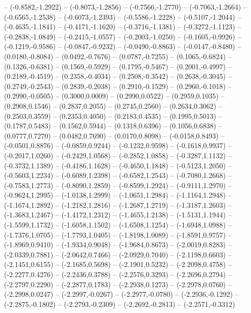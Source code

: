 {	-- (-0.8582,-1.2922)
	-- (-0.8073,-1.2856)
	-- (-0.7566,-1.2770)
	-- (-0.7063,-1.2664)
	-- (-0.6565,-1.2538)
	-- (-0.6073,-1.2393)
	-- (-0.5586,-1.2228)
	-- (-0.5107,-1.2044)
	-- (-0.4635,-1.1841)
	-- (-0.4171,-1.1620)
	-- (-0.3716,-1.1381)
	-- (-0.3272,-1.1123)
	-- (-0.2838,-1.0849)
	-- (-0.2415,-1.0557)
	-- (-0.2003,-1.0250)
	-- (-0.1605,-0.9926)
	-- (-0.1219,-0.9586)
	-- (-0.0847,-0.9232)
	-- (-0.0490,-0.8863)
	-- (-0.0147,-0.8480)
	-- (0.0180,-0.8084)
	-- (0.0492,-0.7676)
	-- (0.0787,-0.7255)
	-- (0.1065,-0.6824)
	-- (0.1326,-0.6381)
	-- (0.1569,-0.5929)
	-- (0.1795,-0.5467)
	-- (0.2001,-0.4997)
	-- (0.2189,-0.4519)
	-- (0.2358,-0.4034)
	-- (0.2508,-0.3542)
	-- (0.2638,-0.3045)
	-- (0.2749,-0.2543)
	-- (0.2839,-0.2038)
	-- (0.2910,-0.1529)
	-- (0.2960,-0.1018)
	-- (0.2990,-0.0505)
	-- (0.3000,0.0009)
	-- (0.2990,0.0522)
	-- (0.2959,0.1035)
	-- (0.2908,0.1546)
	-- (0.2837,0.2055)
	-- (0.2745,0.2560)
	-- (0.2634,0.3062)
	-- (0.2503,0.3559)
	-- (0.2353,0.4050)
	-- (0.2183,0.4535)
	-- (0.1995,0.5013)
	-- (0.1787,0.5483)
	-- (0.1562,0.5944)
	-- (0.1318,0.6396)
	-- (0.1056,0.6838)
	-- (0.0777,0.7270)
	-- (0.0482,0.7690)
	-- (0.0170,0.8098)
	-- (-0.0158,0.8493)
	-- (-0.0501,0.8876)
	-- (-0.0859,0.9244)
	-- (-0.1232,0.9598)
	-- (-0.1618,0.9937)
	-- (-0.2017,1.0260)
	-- (-0.2429,1.0568)
	-- (-0.2852,1.0858)
	-- (-0.3287,1.1132)
	-- (-0.3732,1.1389)
	-- (-0.4186,1.1628)
	-- (-0.4650,1.1848)
	-- (-0.5123,1.2050)
	-- (-0.5603,1.2234)
	-- (-0.6089,1.2398)
	-- (-0.6582,1.2543)
	-- (-0.7080,1.2668)
	-- (-0.7583,1.2773)
	-- (-0.8090,1.2859)
	-- (-0.8599,1.2924)
	-- (-0.9111,1.2970)
	-- (-0.9624,1.2995)
	-- (-1.0138,1.2999)
	-- (-1.0651,1.2984)
	-- (-1.1164,1.2948)
	-- (-1.1674,1.2892)
	-- (-1.2182,1.2816)
	-- (-1.2687,1.2719)
	-- (-1.3187,1.2603)
	-- (-1.3683,1.2467)
	-- (-1.4172,1.2312)
	-- (-1.4655,1.2138)
	-- (-1.5131,1.1944)
	-- (-1.5599,1.1732)
	-- (-1.6058,1.1502)
	-- (-1.6508,1.1254)
	-- (-1.6948,1.0988)
	-- (-1.7376,1.0705)
	-- (-1.7793,1.0405)
	-- (-1.8198,1.0089)
	-- (-1.8591,0.9757)
	-- (-1.8969,0.9410)
	-- (-1.9334,0.9048)
	-- (-1.9684,0.8673)
	-- (-2.0019,0.8283)
	-- (-2.0339,0.7881)
	-- (-2.0642,0.7466)
	-- (-2.0929,0.7040)
	-- (-2.1198,0.6603)
	-- (-2.1451,0.6155)
	-- (-2.1685,0.5698)
	-- (-2.1901,0.5232)
	-- (-2.2098,0.4758)
	-- (-2.2277,0.4276)
	-- (-2.2436,0.3788)
	-- (-2.2576,0.3293)
	-- (-2.2696,0.2794)
	-- (-2.2797,0.2290)
	-- (-2.2877,0.1783)
	-- (-2.2938,0.1273)
	-- (-2.2978,0.0760)
	-- (-2.2998,0.0247)
	-- (-2.2997,-0.0267)
	-- (-2.2977,-0.0780)
	-- (-2.2936,-0.1292)
	-- (-2.2875,-0.1802)
	-- (-2.2793,-0.2309)
	-- (-2.2692,-0.2813)
	-- (-2.2571,-0.3312)
}
